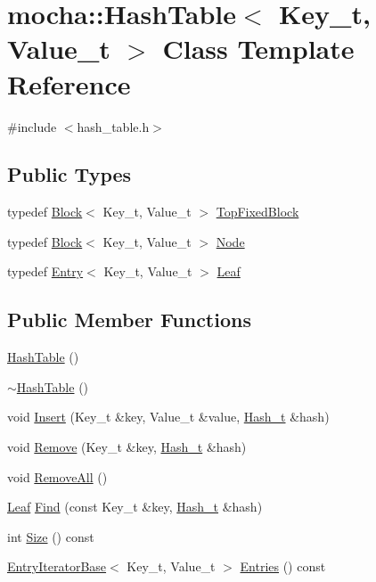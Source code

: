 \hypertarget{classmocha_1_1_hash_table}{
\section{mocha::HashTable$<$ Key\_\-t, Value\_\-t $>$ Class Template Reference}
\label{classmocha_1_1_hash_table}
}


{\ttfamily \#include $<$hash\_\-table.h$>$}

\subsection*{Public Types}
\begin{DoxyCompactItemize}
\item 
typedef \hyperlink{classmocha_1_1_block}{Block}$<$ Key\_\-t, Value\_\-t $>$ \hyperlink{classmocha_1_1_hash_table_a83e016fe56f778ffc27cb24f90304cdf}{TopFixedBlock}
\item 
typedef \hyperlink{classmocha_1_1_block}{Block}$<$ Key\_\-t, Value\_\-t $>$ \hyperlink{classmocha_1_1_hash_table_a1bcb8a4bec495c629f3df6cd6c25b610}{Node}
\item 
typedef \hyperlink{classmocha_1_1_entry}{Entry}$<$ Key\_\-t, Value\_\-t $>$ \hyperlink{classmocha_1_1_hash_table_a3c863111b21220947a039924bf185b18}{Leaf}
\end{DoxyCompactItemize}
\subsection*{Public Member Functions}
\begin{DoxyCompactItemize}
\item 
\hyperlink{classmocha_1_1_hash_table_a924ef91867550f7c3978541d0d9a6d3a}{HashTable} ()
\item 
\hyperlink{classmocha_1_1_hash_table_a509abb4dde83ebb6a16821d952527343}{$\sim$HashTable} ()
\item 
void \hyperlink{classmocha_1_1_hash_table_aea293f99aa0634c44aea47a0e26c7403}{Insert} (Key\_\-t \&key, Value\_\-t \&value, \hyperlink{namespacemocha_ac43feb383f32d7a0b18fc5866cf9ed5c}{Hash\_\-t} \&hash)
\item 
void \hyperlink{classmocha_1_1_hash_table_a892bd72db9c046f3fefbc9180d7d2218}{Remove} (Key\_\-t \&key, \hyperlink{namespacemocha_ac43feb383f32d7a0b18fc5866cf9ed5c}{Hash\_\-t} \&hash)
\item 
void \hyperlink{classmocha_1_1_hash_table_acf1505ea4f3b3734dd573dbd4cde6af2}{RemoveAll} ()
\item 
\hyperlink{classmocha_1_1_entry}{Leaf} \hyperlink{classmocha_1_1_hash_table_ae94879c804070289cf728f3c37b7a689}{Find} (const Key\_\-t \&key, \hyperlink{namespacemocha_ac43feb383f32d7a0b18fc5866cf9ed5c}{Hash\_\-t} \&hash)
\item 
int \hyperlink{classmocha_1_1_hash_table_a9678aab33b6bef7a242fd7236c0df93a}{Size} () const 
\item 
\hyperlink{classmocha_1_1_entry_iterator_base}{EntryIteratorBase}$<$ Key\_\-t, Value\_\-t $>$ \hyperlink{classmocha_1_1_hash_table_aa831a9ac9e54118a34f5aecee513daff}{Entries} () const 
\end{DoxyCompactItemize}
